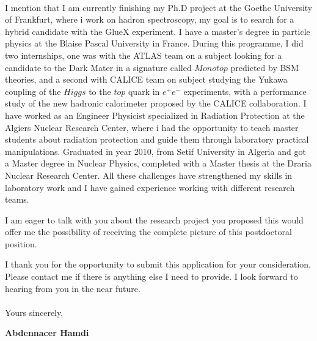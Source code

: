 \documentclass[11pt]{letter}
\begin{document}
~\par I mention that I am currently finishing my Ph.D project at the Goethe University of Frankfurt, where i work on hadron spectroscopy, my goal is to search for a hybrid candidate with the GlueX experiment. I have a master's degree in particle physics at the Blaise Pascal University in France. During this programme, I did two internships, one was with the ATLAS team on a subject looking for a candidate to the Dark Mater in a signature called $Monotop$ predicted by BSM theories, and a second with CALICE team on subject studying the Yukawa coupling of the $Higgs$ to the $top$ quark in $e^{+}e^{-}$ experiments, with a performance study of the new hadronic calorimeter proposed by the CALICE collaboration. I have worked as an Engineer Physicist specialized in Radiation Protection at the Algiers Nuclear Research Center, where i had the opportunity to teach master students about radiation protection and guide them through laboratory practical manipulations. Graduated in year 2010, from Setif University in Algeria and got a Master degree in Nuclear Physics, completed with a Master thesis at the Draria Nuclear Research Center. All these challenges have strengthened my skills in laboratory work and I have gained experience working with different research teams.
~\par I am eager to talk with you about the research project you proposed this would offer me the possibility of receiving the complete picture of this postdoctoral position.
~\par I thank you for the opportunity to submit this application for your consideration. Please contact me if there is anything else I need to provide. I look forward to hearing from you in the near future.\\ \\ %
Yours sincerely,

\begin{flushleft}
 {\bfseries Abdennacer Hamdi}
 \end{flushleft}
 \vfill
 
\end{document}
